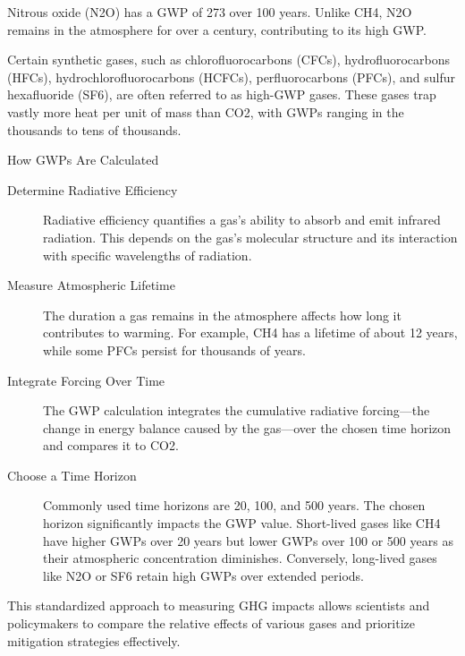 \documentclass{tufte-handout}\usepackage[]{graphicx}\usepackage[]{xcolor}
\begin{document}
Nitrous oxide (N2O) has a GWP of 273 over 100 years. Unlike CH4, N2O remains in the atmosphere for over a century, contributing to its high GWP.

Certain synthetic gases, such as chlorofluorocarbons (CFCs), hydrofluorocarbons (HFCs), hydrochlorofluorocarbons (HCFCs), perfluorocarbons (PFCs), and sulfur hexafluoride (SF6), are often referred to as high-GWP gases. These gases trap vastly more heat per unit of mass than CO2, with GWPs ranging in the thousands to tens of thousands.

How GWPs Are Calculated

\begin{description}
	\item[Determine Radiative Efficiency] Radiative efficiency quantifies a gas’s ability to absorb and emit infrared radiation. This depends on the gas’s molecular structure and its interaction with specific wavelengths of radiation.

	\item[Measure Atmospheric Lifetime] The duration a gas remains in the atmosphere affects how long it contributes to warming. For example, CH4 has a lifetime of about 12 years, while some PFCs persist for thousands of years.

	\item[Integrate Forcing Over Time] The GWP calculation integrates the cumulative radiative forcing—the change in energy balance caused by the gas—over the chosen time horizon and compares it to CO2.

	\item[Choose a Time Horizon] Commonly used time horizons are 20, 100, and 500 years. The chosen horizon significantly impacts the GWP value. Short-lived gases like CH4 have higher GWPs over 20 years but lower GWPs over 100 or 500 years as their atmospheric concentration diminishes. Conversely, long-lived gases like N2O or SF6 retain high GWPs over extended periods.

\end{description}

This standardized approach to measuring GHG impacts allows scientists and policymakers to compare the relative effects of various gases and prioritize mitigation strategies effectively.
\end{document}
